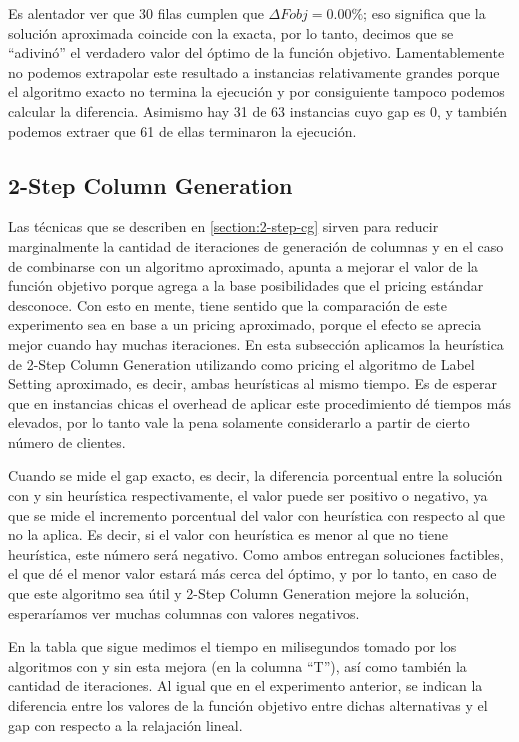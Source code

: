 Es alentador ver que 30 filas cumplen que $\Delta Fobj = 0.00\%$; eso significa que la solución aproximada coincide con la exacta, por lo tanto, decimos que se ``adivinó'' el verdadero valor del óptimo de la función objetivo. Lamentablemente no podemos extrapolar este resultado a instancias relativamente grandes porque el algoritmo exacto no termina la ejecución y por consiguiente tampoco podemos calcular la diferencia. Asimismo hay 31 de 63 instancias cuyo gap es 0, y también podemos extraer que 61 de ellas terminaron la ejecución.   


\subsection{2-Step Column Generation}
\label{section:2-step-cg-testing}

Las técnicas que se describen en \ref{section:2-step-cg} sirven para reducir marginalmente la cantidad de iteraciones de generación de columnas y en el caso de combinarse con un algoritmo aproximado, apunta a mejorar el valor de la función objetivo porque agrega a la base posibilidades que el pricing estándar desconoce. Con esto en mente, tiene sentido que la comparación de este experimento sea en base a un pricing aproximado, porque el efecto se aprecia mejor cuando hay muchas iteraciones. En esta subsección aplicamos la heurística de 2-Step Column Generation utilizando como pricing el algoritmo de Label Setting aproximado, es decir, ambas heurísticas al mismo tiempo. Es de esperar que en instancias chicas el overhead de aplicar este procedimiento dé tiempos más elevados, por lo tanto vale la pena solamente considerarlo a partir de cierto número de clientes. 

Cuando se mide el gap exacto, es decir, la diferencia porcentual entre la solución con y sin heurística respectivamente, el valor puede ser positivo o negativo, ya que se mide el incremento porcentual del valor con heurística con respecto al que no la aplica. Es decir, si el valor con heurística es menor al que no tiene heurística, este número será negativo. Como ambos entregan soluciones factibles, el que dé el menor valor estará más cerca del óptimo, y por lo tanto, en caso de que este algoritmo sea útil y 2-Step Column Generation mejore la solución, esperaríamos ver muchas columnas con valores negativos.

En la tabla que sigue medimos el tiempo en milisegundos tomado por los algoritmos con y sin esta mejora (en la columna ``T''), así como también la cantidad de iteraciones. Al igual que en el experimento anterior, se indican la diferencia entre los valores de la función objetivo entre dichas alternativas y el gap con respecto a la relajación lineal. 


